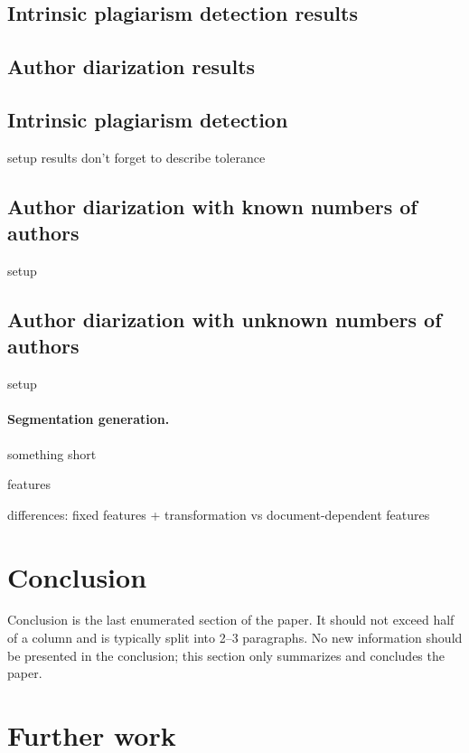 \documentclass[10pt, a4paper]{article}
\begin{document}
\subsection{Intrinsic plagiarism detection results}

\subsection{Author diarization results}



\subsection{Intrinsic plagiarism detection}

setup
results
don't forget to describe tolerance

\subsection{Author diarization with known numbers of authors}

setup

\subsection{Author diarization with unknown numbers of authors}

setup

\paragraph{Segmentation generation.} something short


features

differences: fixed features + transformation vs document-dependent features

\section{Conclusion}

Conclusion is the last enumerated section of the paper. It should not exceed half of a column and is typically split into 2--3 paragraphs. No new information should be presented in the conclusion; this section only summarizes and concludes the paper.

\section{Further work}
\end{document}
